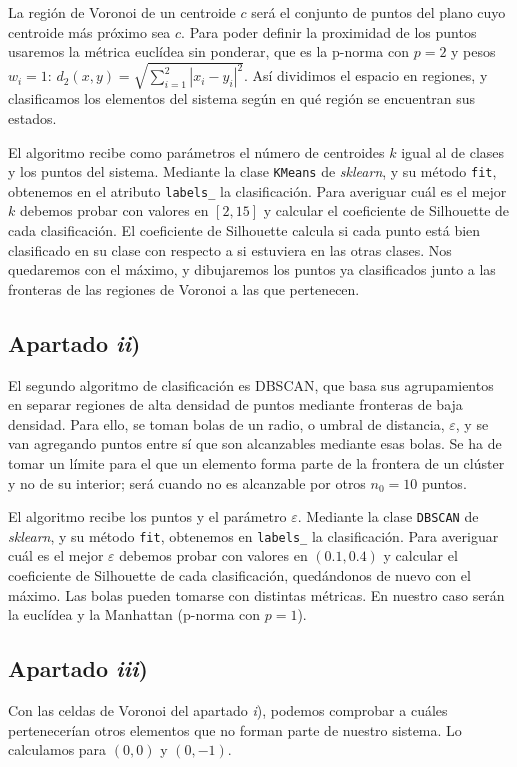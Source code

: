 \documentclass[a4paper]{article}
\begin{document}
	La región de Voronoi de un centroide $c$ será el conjunto de puntos del plano cuyo centroide más próximo sea $c$. Para poder definir la proximidad de los puntos usaremos la métrica euclídea sin ponderar, que es la p-norma con $p=2$ y pesos $w_i=1$: \(d_2(x,y) = \sqrt{\sum_{i=1}^2 |x_i-y_i|^2 }\). Así dividimos el espacio en regiones, y clasificamos los elementos del sistema según en qué región se encuentran sus estados.
	
	El algoritmo recibe como parámetros el número de centroides $k$ \textemdash igual al de clases\textemdash~ y los puntos del sistema. Mediante la clase \verb|KMeans| de \textit{sklearn}, y su método \verb+fit+, obtenemos en el atributo \verb+labels_+ la clasificación. Para averiguar cuál es el mejor $k$ debemos probar con valores en $[2,15]$ y calcular el coeficiente de Silhouette de cada clasificación. El coeficiente de Silhouette calcula si cada punto está bien clasificado en su clase con respecto a si estuviera en las otras clases. Nos quedaremos con el máximo, y dibujaremos los puntos ya clasificados junto a las fronteras de las regiones de Voronoi a las que pertenecen.
	
	
	\subsection{Apartado \textit{ii})}
	El segundo algoritmo de clasificación es DBSCAN, que basa sus agrupamientos en separar regiones de alta densidad de puntos mediante fronteras de baja densidad. Para ello, se toman bolas de un radio, o umbral de distancia, $\varepsilon$, y se van agregando puntos entre sí que son alcanzables mediante esas bolas. Se ha de tomar un límite para el que un elemento forma parte de la frontera de un clúster y no de su interior; será cuando no es alcanzable por otros $n_0=10$ puntos.
	
	El algoritmo recibe los puntos y el parámetro $\varepsilon$. Mediante la clase \verb|DBSCAN| de \textit{sklearn}, y su método \verb+fit+, obtenemos en \verb+labels_+ la clasificación. Para averiguar cuál es el mejor $\varepsilon$ debemos probar con valores en $(0.1,0.4)$ y calcular el coeficiente de Silhouette de cada clasificación, quedándonos de nuevo con el máximo. Las bolas pueden tomarse con distintas métricas. En nuestro caso serán la euclídea y la Manhattan (p-norma con $p=1$).
	
	\subsection{Apartado \textit{iii})}
	Con las celdas de Voronoi del apartado \textit{i}), podemos comprobar a cuáles pertenecerían otros elementos que no forman parte de nuestro sistema. Lo calculamos para $(0,0)$ y $(0,-1)$.
	
\end{document}
